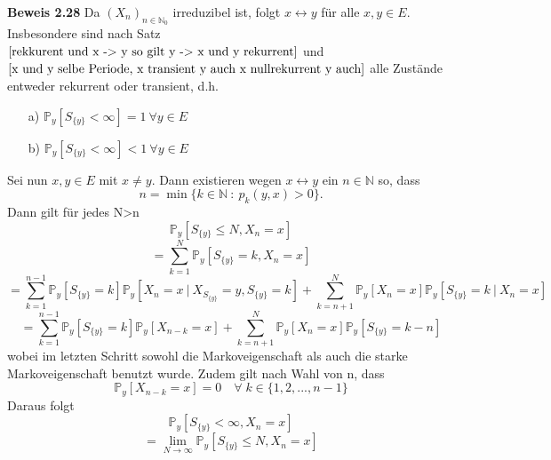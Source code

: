 \textbf{Beweis 2.28}
Da $(X_{n})_{n \in \mathbb{N}_{0}}$ irreduzibel ist, folgt $x \leftrightarrow y$ für alle $x,y \in E$. Insbesondere sind nach Satz $\ref{rekkurent und x -> y so gilt y -> x und y rekurrent}$ und $\ref{x und y selbe Periode, x transient y auch x nullrekurrent y auch}$ alle Zustände entweder rekurrent oder transient, d.h.
\begin{itemize}
\item[a)] $\mathbb{P}_{y}[S_{\lbrace y \rbrace} < \infty] = 1 \: \forall y \in E$
\item[b)] $\mathbb{P}_{y}[S_{\lbrace y \rbrace} < \infty] < 1 \: \forall y \in E$
\end{itemize}
Sei nun $x,y \in E$ mit $x \neq y$. Dann existieren wegen $x \leftrightarrow y$ ein $n \in \mathbb{N}$ so, dass
\begin{equation*}
n = \min \lbrace k \in \mathbb{N} \: : \: p_{k}(y,x)>0 \rbrace.
\end{equation*}
Dann gilt für jedes N>n
\begin{equation*}
\mathbb{P}_{y}[S_{\lbrace y \rbrace} \leq N, X_{n} = x]
\end{equation*}
\begin{equation*}
= \sum_{k=1}^{N} \mathbb{P}_{y}[S_{\lbrace y \rbrace} = k, X_{n} = x]
\end{equation*}
\begin{equation*}
= \sum_{k=1}^{n-1} \mathbb{P}_{y}[S_{\lbrace y \rbrace} = k]\mathbb{P}_{y}[X_{n} = x \: | \: X_{S_{\lbrace y \rbrace}} = y, S_{\lbrace y \rbrace} = k] + \sum_{k=n+1}^{N} \mathbb{P}_{y}[X_{n} =x]\mathbb{P}_{y}[S_{\lbrace y \rbrace} = k \: | \: X_{n} = x]
\end{equation*}
\begin{equation*}
= \sum_{k=1}^{n-1} \mathbb{P}_{y}[S_{\lbrace y \rbrace} = k]\mathbb{P}_{y}[X_{n-k} = x] + \sum_{k=n+1}^{N} \mathbb{P}_{y}[X_{n} =x]\mathbb{P}_{y}[S_{\lbrace y \rbrace} = k-n]
\end{equation*}
wobei im letzten Schritt sowohl die Markoveigenschaft als auch die starke Markoveigenschaft benutzt wurde. Zudem gilt nach Wahl von n, dass
\begin{equation*}
\mathbb{P}_{y}[X_{n-k} = x] = 0 \quad \forall \; k \in \lbrace 1,2,...,n-1 \rbrace
\end{equation*}
Daraus folgt
\begin{equation*}
\mathbb{P}_{y}[S_{\lbrace y \rbrace} < \infty, X_{n} = x]
\end{equation*}
\begin{equation*}
= \lim_{N \to \infty} \mathbb{P}_{y}[S_{\lbrace y \rbrace} \leq N, X_{n} = x]
\end{equation*}
